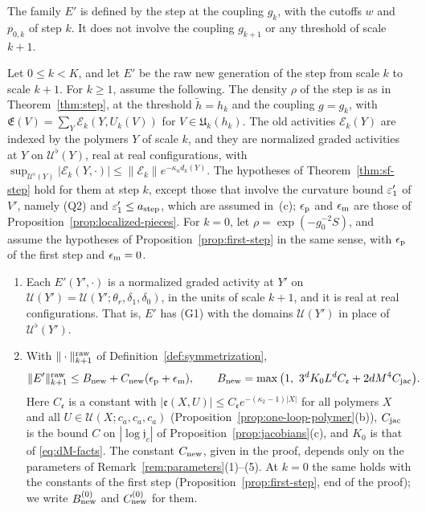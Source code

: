 The family $E'$ is defined by the step at the coupling $g_k$, with the cutoffs $w$ and $p_{0,k}$ of step $k$. It does not involve the coupling $g_{k+1}$ or any threshold of scale $k+1$.

\begin{lemma}\label{lem:raw-new}
Let $0\le k<K$, and let $E'$ be the raw new generation of the step from scale $k$ to scale $k+1$. For $k\ge1$, assume the following. The density $\rho$ of the step is as in Theorem~\ref{thm:step}, at the threshold $\tilde h=h_k$ and the coupling $g=g_k$, with $\mathfrak E(V)=\sum_Y\mathcal E_k(Y,U_k(V))$ for $V\in\mathfrak U_k(h_k)$. The old activities $\mathcal E_k(Y)$ are indexed by the polymers $Y$ of scale $k$, and they are normalized graded activities at $Y$ on $\mathcal U^\flat(Y)$, real at real configurations, with $\sup_{\mathcal U^\flat(Y)}|\mathcal E_k(Y,\cdot)|\le\|\mathcal E_k\|e^{-\kappa_nd_k(Y)}$. The hypotheses of Theorem~\ref{thm:sf-step} hold for them at step $k$, except those that involve the curvature bound $\varepsilon'_1$ of $V'$, namely (Q2) and $\varepsilon'_1\le a_{\rm step}$, which are assumed in~(c); $\epsilon_{\rm p}$ and $\epsilon_{\rm m}$ are those of Proposition~\ref{prop:localized-pieces}. For $k=0$, let $\rho=\exp(-g_0^{-2}S)$, and assume the hypotheses of Proposition~\ref{prop:first-step} in the same sense, with $\epsilon_{\rm p}$ of the first step and $\epsilon_{\rm m}=0$.
\begin{enumerate}[label=(\alph*)]
\item Each $E'(Y',\cdot)$ is a normalized graded activity at $Y'$ on $\mathcal U(Y')=\mathcal U(Y';\theta_r,\delta_1,\delta_0)$, in the units of scale $k+1$, and it is real at real configurations. That is, $E'$ has (G1) with the domains $\mathcal U(Y')$ in place of $\mathcal U^\flat(Y')$.
\item With $\|\cdot\|^{\rm raw}_{k+1}$ of Definition~\ref{def:symmetrization},
\[
\|E'\|^{\rm raw}_{k+1}\le B_{\rm new}+C_{\rm new}(\epsilon_{\rm p}+\epsilon_{\rm m}),\qquad B_{\rm new}=\max\big(1,\ 3^dK_0L^dC_{\mathfrak e}+2dM^4C_{\rm jac}\big).
\]
Here $C_{\mathfrak e}$ is a constant with $|\mathfrak e(X,U)|\le C_{\mathfrak e}e^{-(\kappa_2-1)|X|}$ for all polymers $X$ and all $U\in\mathcal U(X;c_a,c_a,c_a)$ (Proposition~\ref{prop:one-loop-polymer}(b)), $C_{\rm jac}$ is the bound $C$ on $|\log\mathfrak j_c|$ of Proposition~\ref{prop:jacobians}(c), and $K_0$ is that of \eqref{eq:dM-facts}. The constant $C_{\rm new}$, given in the proof, depends only on the parameters of Remark~\ref{rem:parameters}(1)--(5). At $k=0$ the same holds with the constants of the first step (Proposition~\ref{prop:first-step}, end of the proof); we write $B^{(0)}_{\rm new}$ and $C^{(0)}_{\rm new}$ for them.

\end{enumerate}
\end{lemma}
